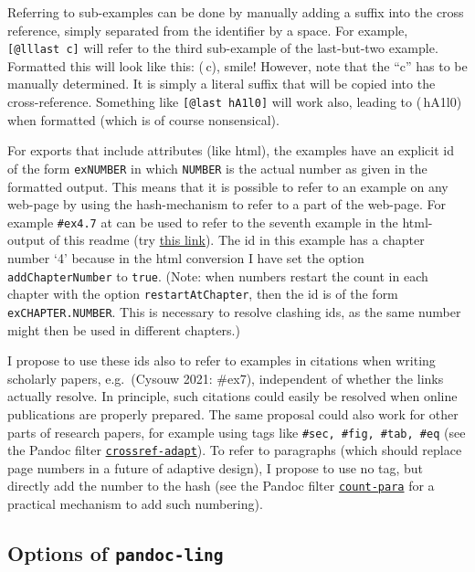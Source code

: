 \documentclass[
]{article}
\begin{document}
Referring to sub-examples can be done by manually adding a suffix into
the cross reference, simply separated from the identifier by a space.
For example, \texttt{{[}@lllast~c{]}} will refer to the third
sub-example of the last-but-two example. Formatted this will look like
this: (\,c), smile! However, note that the ``c'' has to be
manually determined. It is simply a literal suffix that will be copied
into the cross-reference. Something like \texttt{{[}@last\ hA1l0{]}}
will work also, leading to (\,hA1l0) when formatted (which
is of course nonsensical).

For exports that include attributes (like html), the examples have an
explicit id of the form \texttt{exNUMBER} in which \texttt{NUMBER} is
the actual number as given in the formatted output. This means that it
is possible to refer to an example on any web-page by using the
hash-mechanism to refer to a part of the web-page. For example
\texttt{\#ex4.7} at can be used to refer to the seventh example in the
html-output of this readme (try
\href{https://cysouw.github.io/pandoc-ling/readme.html\#ex4.7}{this
link}). The id in this example has a chapter number `4' because in the
html conversion I have set the option \texttt{addChapterNumber} to
\texttt{true}. (Note: when numbers restart the count in each chapter
with the option \texttt{restartAtChapter}, then the id is of the form
\texttt{exCHAPTER.NUMBER}. This is necessary to resolve clashing ids, as
the same number might then be used in different chapters.)

I propose to use these ids also to refer to examples in citations when
writing scholarly papers, e.g.~(Cysouw 2021: \#ex7), independent of
whether the links actually resolve. In principle, such citations could
easily be resolved when online publications are properly prepared. The
same proposal could also work for other parts of research papers, for
example using tags like \texttt{\#sec,\ \#fig,\ \#tab,\ \#eq} (see the
Pandoc filter
\href{https://github.com/cysouw/crossref-adapt}{\texttt{crossref-adapt}}).
To refer to paragraphs (which should replace page numbers in a future of
adaptive design), I propose to use no tag, but directly add the number
to the hash (see the Pandoc filter
\href{https://github.com/cysouw/count-para}{\texttt{count-para}} for a
practical mechanism to add such numbering).

\subsection{\texorpdfstring{Options of
\texttt{pandoc-ling}}{Options of pandoc-ling}}\label{options-of-pandoc-ling}
\end{document}
